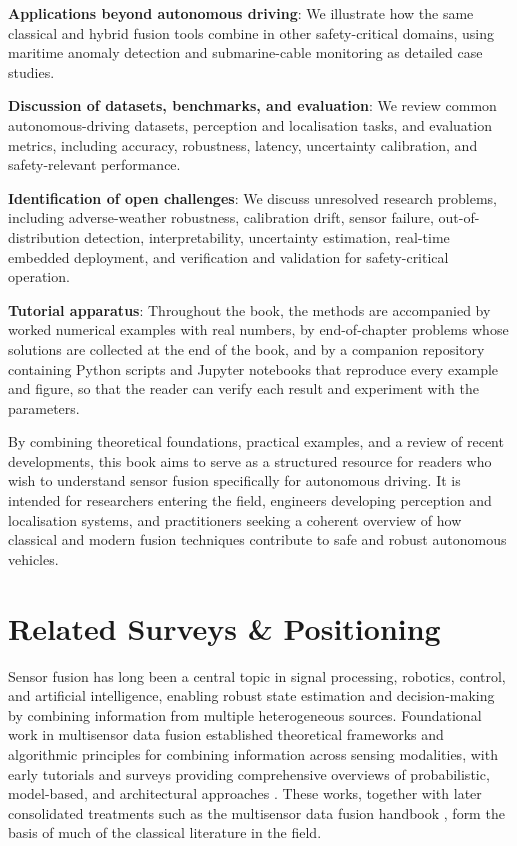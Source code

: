 \begin{list4a}
    \item \textbf{Applications beyond autonomous driving}: We illustrate how the same classical and hybrid fusion tools combine in other safety-critical domains, using maritime anomaly detection and submarine-cable monitoring as detailed case studies.
    \item \textbf{Discussion of datasets, benchmarks, and evaluation}: We review common autonomous-driving datasets, perception and localisation tasks, and evaluation metrics, including accuracy, robustness, latency, uncertainty calibration, and safety-relevant performance.
    \item \textbf{Identification of open challenges}: We discuss unresolved research problems, including adverse-weather robustness, calibration drift, sensor failure, out-of-distribution detection, interpretability, uncertainty estimation, real-time embedded deployment, and verification and validation for safety-critical operation.
    \item \textbf{Tutorial apparatus}: Throughout the book, the methods are accompanied by worked numerical examples with real numbers, by end-of-chapter problems whose solutions are collected at the end of the book, and by a companion repository containing Python scripts and Jupyter notebooks that reproduce every example and figure, so that the reader can verify each result and experiment with the parameters.
\end{list4a}

By combining theoretical foundations, practical examples, and a review of recent developments, this book aims to serve as a structured resource for readers who wish to understand sensor fusion specifically for autonomous driving. It is intended for researchers entering the field, engineers developing perception and localisation systems, and practitioners seeking a coherent overview of how classical and modern fusion techniques contribute to safe and robust autonomous vehicles. 

\section{Related Surveys \& Positioning}
\label{subsec:related}

Sensor fusion has long been a central topic in signal processing, robotics, control, and artificial intelligence, enabling robust state estimation and decision-making by combining information from multiple heterogeneous sources. Foundational work in multisensor data fusion established theoretical frameworks and algorithmic principles for combining information across sensing modalities, with early tutorials and surveys providing comprehensive overviews of probabilistic, model-based, and architectural approaches \cite{hall_introduction_1997, luo_multisensor_1989}. These works, together with later consolidated treatments such as the multisensor data fusion handbook \cite{liggins_handbook_2009}, form the basis of much of the classical literature in the field.


